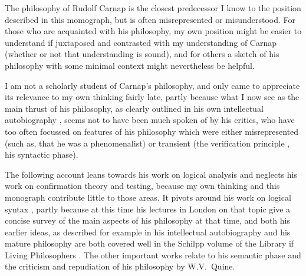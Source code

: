 The philosophy of Rudolf Carnap is the closest predecessor I know to the position described in this momograph, but is often misrepresented or misunderstood.
For those who are acquainted with his philosophy, my own position might be easier to understand if juxtaposed and contrasted with my understanding of Carnap (whether or not that understanding is sound), and for others a sketch of his philosophy with some minimal context might nevertheless be helpful.

I am not a scholarly student of Carnap's philosophy, and only came to appreciate its relevance to my own thinking fairly late, partly because what I now see as the main thrust of his philosophy, as clearly outlined in his own intellectual autobiography \cite{carnap63a,carnap63}, seems not to have been much spoken of by his critics, who have too often focussed on features of his philosophy which were either misrepresented (such as, that he was a phenomenalist) or transient (the verification principle \cite{carnap37}, his syntactic phase).

The following account leans towards his work on logical analysis and neglects his work on confirmation theory and testing, because my own thinking and this monograph contribute little to those areas.
It pivots around his work on logical syntax \cite{carnap35}, partly because at this time his lectures in London on that topic \cite{carnap37} give a concise survey of the main aspects of his philosophy at that time, and both his earlier ideas, as described for example in his intellectual autobiography \cite{carnap63} and his mature philosophy are both covered well in the Schilpp volume of the Library if Living Philosophers \cite{carnap63a}.
The other important works \cite{carnap56,carnap50,carnap90}  relate to his semantic phase and the criticism and repudiation of his philosophy by W.V.~Quine.
